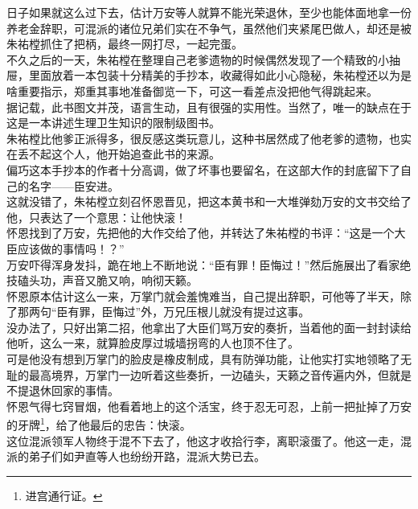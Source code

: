 \begin{multicols}{\theparacolNo}
日子如果就这么过下去，估计万安等人就算不能光荣退休，至少也能体面地拿一份养老金辞职，可混派的诸位兄弟们实在不争气，虽然他们夹紧尾巴做人，却还是被朱祐樘抓住了把柄，最终一网打尽，一起完蛋。\\

不久之后的一天，朱祐樘在整理自己老爹遗物的时候偶然发现了一个精致的小抽屉，里面放着一本包装十分精美的手抄本，收藏得如此小心隐秘，朱祐樘还以为是啥重要指示，郑重其事地准备御览一下，可这一看差点没把他气得跳起来。\\

据记载，此书图文并茂，语言生动，且有很强的实用性。当然了，唯一的缺点在于这是一本讲述生理卫生知识的限制级图书。\\

朱祐樘比他爹正派得多，很反感这类玩意儿，这种书居然成了他老爹的遗物，也实在丢不起这个人，他开始追查此书的来源。\\

偏巧这本手抄本的作者十分高调，做了坏事也要留名，在这部大作的封底留下了自己的名字——臣安进。\\

这就没错了，朱祐樘立刻召怀恩晋见，把这本黄书和一大堆弹劾万安的文书交给了他，只表达了一个意思：让他快滚！\\

怀恩找到了万安，先把他的大作交给了他，并转达了朱祐樘的书评：“这是一个大臣应该做的事情吗！？”\\

万安吓得浑身发抖，跪在地上不断地说：“臣有罪！臣悔过！”然后施展出了看家绝技磕头功，声音又脆又响，响彻天籁。\\

怀恩原本估计这么一来，万掌门就会羞愧难当，自己提出辞职，可他等了半天，除了那两句“臣有罪，臣悔过”外，万兄压根儿就没有提过这事。\\

没办法了，只好出第二招，他拿出了大臣们骂万安的奏折，当着他的面一封封读给他听，这么一来，就算脸皮厚过城墙拐弯的人也顶不住了。\\

可是他没有想到万掌门的脸皮是橡皮制成，具有防弹功能，让他实打实地领略了无耻的最高境界，万掌门一边听着这些奏折，一边磕头，天籁之音传遍内外，但就是不提退休回家的事情。\\

怀恩气得七窍冒烟，他看着地上的这个活宝，终于忍无可忍，上前一把扯掉了万安的牙牌\footnote{进宫通行证。}，给了他最后的忠告：快滚。\\

这位混派领军人物终于混不下去了，他这才收拾行李，离职滚蛋了。他这一走，混派的弟子们如尹直等人也纷纷开路，混派大势已去。\\


\end{multicols}
